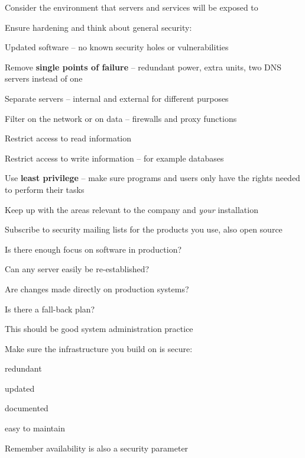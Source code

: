 \documentclass[Screen16to9,17pt]{foils}
\begin{document}
\begin{list1}
\item Consider the environment that servers and services will be exposed to
\item Ensure hardening and think about general security:
  \begin{list2}
  \item Updated software -- no known security holes or vulnerabilities
  \item Remove {\bfseries single points of failure} -- redundant power, extra units, two DNS servers instead of one
  \item Separate servers -- internal and external for different purposes
  \item Filter on the network or on data -- firewalls and proxy functions
  \item Restrict access to read information
  \item Restrict access to write information -- for example databases
  \item Use {\bfseries least privilege} -- make sure programs and users only have the rights needed to perform their tasks
  \item Keep up with the areas relevant to the company and \emph{your} installation
  \end{list2}
\item Subscribe to security mailing lists for the products you use, also open source
\end{list1}


\begin{list1}
\item Is there enough focus on software in production?
\item Can any server easily be re-established?
\item Are changes made directly on production systems?
\item Is there a fall-back plan?
\item This should be good system administration practice
\end{list1}


\begin{list1}
\item Make sure the infrastructure you build on is secure:
\begin{list2}
\item redundant
\item updated
\item documented
\item easy to maintain
\end{list2}
\item Remember availability is also a security parameter
\end{list1}
\end{document}
